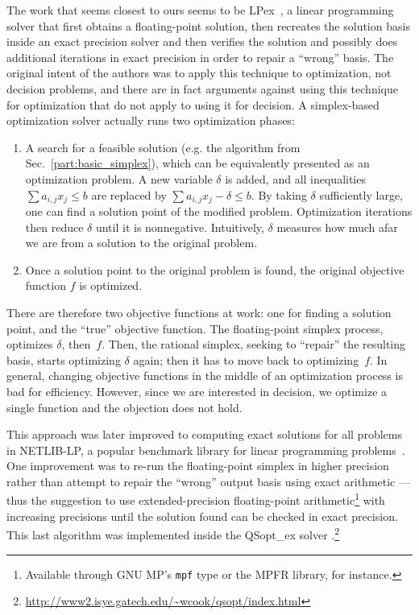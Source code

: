 The work that seems closest to ours seems to be LPex~\cite{Dihflaoui_et_al_SODA03}, a linear programming solver that first obtains a floating-point solution, then recreates the solution basis inside an exact precision solver and then verifies the solution and possibly does additional iterations in exact precision in order to repair a ``wrong'' basis. The original intent of the authors was to apply this technique to optimization, not decision problems, and there are in fact arguments against using this technique for optimization that do not apply to using it for decision. A simplex-based optimization solver actually runs two optimization phases:
\begin{enumerate}
\item A search for a feasible solution (e.g. the algorithm from Sec.~\ref{part:basic_simplex}), which can be equivalently presented as an optimization problem. A new variable $\delta$ is added, and all inequalities $\sum a_{i,j} x_j \leq b$ are replaced by $\sum a_{i,j} x_j - \delta \leq b$. By taking $\delta$ sufficiently large, one can find a solution point of the modified problem. Optimization iterations then reduce $\delta$ until it is nonnegative. Intuitively, $\delta$ measures how much afar we are from a solution to the original problem.

\item Once a solution point to the original problem is found, the original objective function $f$ is optimized.
\end{enumerate}
There are therefore two objective functions at work: one for finding a solution point, and the ``true'' objective function. The floating-point simplex process, optimizes $\delta$, then~$f$. Then, the rational simplex, seeking to ``repair'' the resulting basis, starts optimizing $\delta$ again; then it has to move back to optimizing~$f$. In general, changing objective functions in the middle of an optimization process is bad for efficiency. However, since we are interested in decision, we optimize a single function and the objection does not hold.

This approach was later improved to computing exact solutions for all problems in NETLIB-LP, a popular benchmark library for linear programming problems~\cite{Koch_thefinal_ORL04}. One improvement was to re-run the floating-point simplex in higher precision rather than attempt to repair the ``wrong'' output basis using exact arithmetic --- thus the suggestion to use extended-precision floating-point arithmetic\footnote{Available through GNU MP's \texttt{mpf} type or the MPFR library, for instance.}
with increasing precisions until the solution found can be checked in exact precision. This last algorithm was implemented inside the QSopt\_ex solver \cite{DBLP:journals/orl/ApplegateCDE07}.\footnote{\url{http://www2.isye.gatech.edu/~wcook/qsopt/index.html}}

